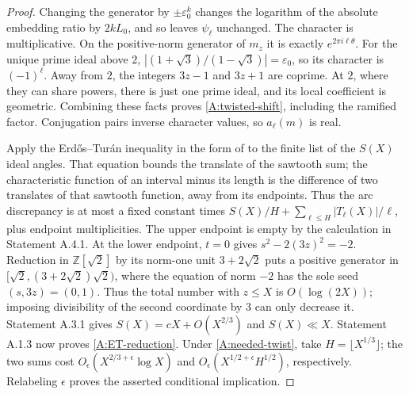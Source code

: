 \begin{proof}
Changing the generator by $\pm\varepsilon_0^k$ changes the logarithm
of the absolute embedding ratio by $2kL_0$, and so leaves
$\psi_\ell$ unchanged. The character is multiplicative. On the
positive-norm generator of $m_z$ it is exactly
$e^{2\pi i\ell\theta}$. For the unique prime ideal above $2$,
$|(1+\sqrt3)/(1-\sqrt3)|=\varepsilon_0$, so its character is
$(-1)^\ell$. Away from $2$, the integers $3z-1$ and $3z+1$ are
coprime. At $2$, where they can share powers, there is just one prime
ideal, and its local coefficient is geometric. Combining these facts
proves \eqref{A:twisted-shift}, including the ramified factor.
Conjugation pairs inverse character values, so $a_\ell(m)$ is real.

Apply the Erd\H{o}s--Tur\'an inequality in the form of
\cite[equation (8.2)]{CarneiroVaaler2010} to the finite list of the
$S(X)$ ideal angles. That equation bounds the translate of the sawtooth
sum; the characteristic function of an interval minus its length is
the difference of two translates of that sawtooth function, away from
its endpoints. Thus the arc discrepancy is at most a fixed constant
times $S(X)/H+\sum_{\ell\leq H}|T_\ell(X)|/\ell$, plus endpoint
multiplicities. The upper endpoint is empty by the calculation in
Statement A.4.1. At the lower endpoint, $t=0$ gives
$s^2-2(3z)^2=-2$. Reduction in $\mathbb Z[\sqrt2]$ by its norm-one
unit $3+2\sqrt2$ puts a positive generator in
$[\sqrt2,(3+2\sqrt2)\sqrt2)$, where the equation of norm $-2$
has the sole seed $(s,3z)=(0,1)$. Thus the total number with
$z\leq X$ is $O(\log(2X))$; imposing divisibility of the second
coordinate by $3$ can only decrease it.
Statement A.3.1 gives $S(X)=cX+O(X^{2/3})$ and $S(X)\ll X$.
Statement A.1.3 now proves \eqref{A:ET-reduction}.
Under \eqref{A:needed-twist}, take $H=\lfloor X^{1/3}\rfloor$;
the two sums cost $O_\epsilon(X^{2/3+\epsilon}\log X)$ and
$O_\epsilon(X^{1/2+\epsilon}H^{1/2})$, respectively. Relabeling
$\epsilon$ proves the asserted conditional implication.
\end{proof}

